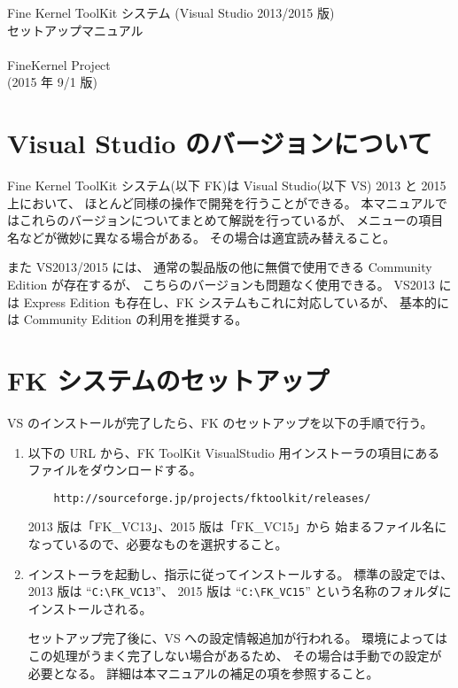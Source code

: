 \documentclass[a4j]{jarticle}
\begin{document}
\begin{center}
{\Large Fine Kernel ToolKit システム (Visual Studio 2013/2015 版) \\
	セットアップマニュアル} \\ ~ \\
{\Large FineKernel Project} \\
(2015 年 9/1 版)
\end{center}


\section{Visual Studio のバージョンについて}
Fine Kernel ToolKit システム(以下 FK)は 
Visual Studio(以下 VS) 2013 と 2015 上において、
ほとんど同様の操作で開発を行うことができる。
本マニュアルではこれらのバージョンについてまとめて解説を行っているが、
メニューの項目名などが微妙に異なる場合がある。
その場合は適宜読み替えること。

また VS2013/2015 には、
通常の製品版の他に無償で使用できる Community Edition が存在するが、
こちらのバージョンも問題なく使用できる。
VS2013 には Express Edition も存在し、FK システムもこれに対応しているが、
基本的には Community Edition の利用を推奨する。

\section{FK システムのセットアップ}
VS のインストールが完了したら、FK のセットアップを以下の手順で行う。

\begin{enumerate}
\item 以下の URL から、FK ToolKit VisualStudio 用インストーラの項目にある
ファイルをダウンロードする。

\begin{verbatim}
    http://sourceforge.jp/projects/fktoolkit/releases/
\end{verbatim}

2013 版は「FK\_VC13」、2015 版は「FK\_VC15」から
始まるファイル名になっているので、必要なものを選択すること。

\item インストーラを起動し、指示に従ってインストールする。
標準の設定では、2013 版は ``\verb+C:\FK_VC13+''、
2015 版は ``\verb+C:\FK_VC15+'' という名称のフォルダにインストールされる。

セットアップ完了後に、VS への設定情報追加が行われる。
環境によってはこの処理がうまく完了しない場合があるため、
その場合は手動での設定が必要となる。
詳細は本マニュアルの補足の項を参照すること。


\end{enumerate}
\end{document}
